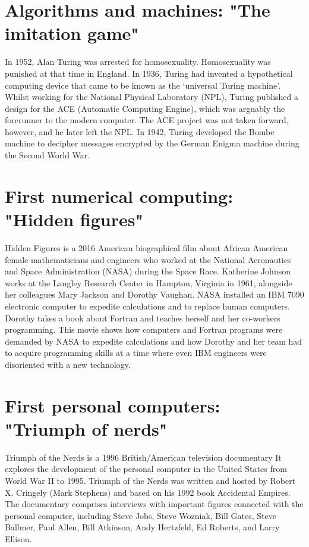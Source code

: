   
  \newpage 
\section*{Algorithms and machines: "The imitation game"} 
 In 1952, Alan Turing was arrested for homosexuality. 
 Homosexuality was punished at that time in England. 
 In 1936, Turing had invented a hypothetical computing device that came to be known 
 as the ‘universal Turing machine’. 
 Whilst working for the National Physical Laboratory (NPL), 
 Turing published a design for the ACE (Automatic Computing Engine), which was 
 arguably the forerunner to the modern computer. 
 The ACE project was not taken forward, however, and he later left the NPL. 
 In 1942,  Turing developed the Bombe machine to decipher messages encrypted by the German Enigma 
 machine during the Second World War. 
 
   
   
\section*{First numerical computing: "Hidden figures"}
 Hidden Figures is a 2016 American biographical  film 
 about African American female mathematicians and engineers 
 who worked at the National Aeronautics and Space Administration (NASA) 
 during the Space Race.
 Katherine Johnson works at the Langley Research Center in Hampton, Virginia in 1961, 
 alongside her colleagues Mary Jackson and Dorothy Vaughan. 
 NASA installed an IBM 7090 electronic computer to expedite calculations and to replace human computers. 
 Dorothy takes a book about Fortran and teaches herself and her co-workers programming. 
 This movie shows how computers and Fortran programs were demanded by NASA
 to expedite calculations and how Dorothy and her team had to acquire programming skills 
 at a time where even IBM engineers were disoriented with a new technology. 
 
  
   
  
\section*{First personal computers: "Triumph of nerds"}
 Triumph of the Nerds is a 1996 British/American television documentary
 It explores the development of the personal computer in the United States from World War II to 1995. 
 Triumph of the Nerds was written and hosted by Robert X. Cringely (Mark Stephens) 
 and based on his 1992 book Accidental Empires. 
 The documentary comprises interviews with important figures connected with the personal computer, 
 including Steve Jobs, Steve Wozniak, Bill Gates, Steve Ballmer, Paul Allen, Bill Atkinson, 
 Andy Hertzfeld, Ed Roberts, and Larry Ellison. 
 
